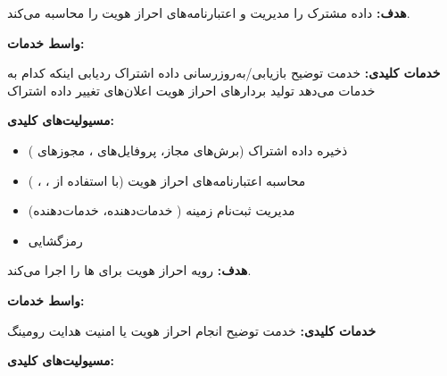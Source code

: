 
\textbf{هدف:} داده مشترک را مدیریت و اعتبارنامه‌های احراز هویت را محاسبه می‌کند.

\textbf{واسط خدمات:} 

\textbf{خدمات کلیدی:}\CNbr{}\lr{\textbar{}} خدمت \lr{\textbar{}} توضیح \lr{\textbar{}}\CNbr{}\CNbr{} بازیابی/\allowbreak{}به‌روزرسانی داده اشتراک \lr{\textbar{}}\CNbr{} ردیابی اینکه کدام  به  خدمات می‌دهد \lr{\textbar{}}\CNbr{} تولید بردارهای احراز هویت \lr{\textbar{}}\CNbr{} اعلان‌های تغییر داده اشتراک \lr{\textbar{}}

\textbf{مسیولیت‌های کلیدی:}

\begin{itemize}
\tightlist
\item
  ذخیره داده اشتراک (برش‌های مجاز، پروفایل‌های ، مجوزهای )
\item
  محاسبه اعتبارنامه‌های احراز هویت (با استفاده از ، ، )
\item
  مدیریت ثبت‌نام زمینه  ( خدمات‌دهنده،  خدمات‌دهنده)
\item
  رمزگشایی 
\end{itemize}


\textbf{هدف:} رویه احراز هویت برای ها را اجرا می‌کند.

\textbf{واسط خدمات:} 

\textbf{خدمات کلیدی:}\CNbr{}\lr{\textbar{}} خدمت \lr{\textbar{}} توضیح \lr{\textbar{}}\CNbr{}\CNbr{} انجام احراز هویت  یا  \lr{\textbar{}}\CNbr{} امنیت هدایت رومینگ \lr{\textbar{}}

\textbf{مسیولیت‌های کلیدی:}

